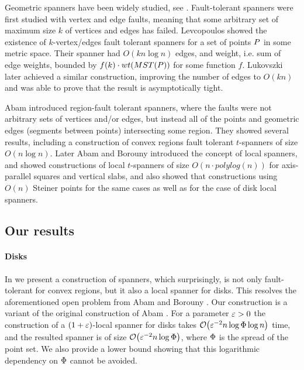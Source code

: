 \documentclass[12pt]{article}%
\begin{document}
Geometric spanners have been widely studied, see \cite{ns-gsn-07}. Fault-tolerant spanners were first studied with vertex and edge faults, meaning that some arbitrary set of maximum size $k$ of vertices and edges has failed. Levcopoulos \etal \cite{lns-iacfts-02} showed the existence of $k$-vertex/edges fault tolerant spanners for a set of points $P$ in some metric space. Their spanner had $O(kn\log n)$ edges, and weight, i.e. sum of edge weights, bounded by $f(k)\cdot wt(MST(P))$ for some function $f$. Lukovszki \cite{l-nrftgs-99} later achieved a similar construction, improving the number of edges to $O(kn)$ and was able to prove that the result is asymptotically tight.

Abam \etal\cite{abfg-rftgs-09} introduced region-fault tolerant spanners, where the faults were not arbitrary sets of vertices and/or edges, but instead all of the points and geometric edges (segments between points) intersecting some region. They showed several results, including a construction of convex regions fault tolerant $t$-spanners of size $O(n\log n)$. Later Abam and Borouny \cite{ab-lgs-21} introduced the concept of local spanners, and showed constructions of local $t$-spanners of size $O(n\cdot polylog(n))$ for axis-parallel squares and vertical slabs, and also showed that constructions using $O(n)$ Steiner points for the same cases as well as for the case of disk local spanners.

\subsection*{Our results}

\paragraph{Disks}
In  we present a construction of spanners, which surprisingly, is not
only fault-tolerant for convex regions, but it also a local spanner
for disks. This resolves the aforementioned open problem from Abam and
Borouny \cite{ab-lgs-21}. Our construction is a variant of the
original construction of Abam \etal \cite{abfg-rftgs-09}. For a parameter $\varepsilon>0$ the construction of a $(1+\varepsilon)$-local spanner for disks takes $\Of\pth{ \eps^{-2} n\log \spread \log n }$ time, and the resulted spanner is of size $\Of\pth{ \eps^{-2} n\log \spread }$, where $\Phi$ is the spread of the point set. We also provide a lower bound showing that this logarithmic dependency on $\Phi$ cannot be avoided.
 
\end{document}
